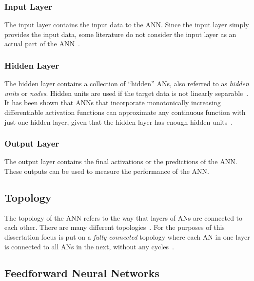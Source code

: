 \subsubsection{Input Layer}\label{sec:anns:anns:architecture:input}

The input layer contains the input data to the \acs{ANN}. Since the input layer simply provides the input data, some literature do not consider the input layer as an actual part of the \acs{ANN}~\cite{ref:engelbrecht:2007}.

\subsubsection{Hidden Layer}\label{sec:anns:anns:architecture:hidden}

The hidden layer contains a collection of ``hidden'' \acp{AN}, also referred to as \textit{hidden units} or \textit{nodes}. Hidden units are used if the target data is not linearly separable~\cite{ref:engelbrecht:2007}. It has been shown that \acp{ANN} that incorporate monotonically increasing differentiable activation functions can approximate any continuous function with just one hidden layer, given that the hidden layer has enough hidden units~\cite{ref:hornik:1989}.

\subsubsection{Output Layer}\label{sec:anns:anns:architecture:output}

The output layer contains the final activations or the predictions of the \acs{ANN}. These outputs can be used to measure the performance of the \acs{ANN}.


\subsection{Topology}
\label{sec:anns:anns:topology}

The topology of the \acs{ANN} refers to the way that layers of \acp{AN} are connected to each other. There are many different topologies~\cite{ref:miikkulainen:2010}. For the purposes of this dissertation focus is put on a \textit{fully connected} topology where each \acs{AN} in one layer is connected to all \acp{AN} in the next, without any cycles~\cite{ref:zell:1994}.


\subsection{Feedforward Neural Networks}\label{sec:anns:anns:ffnns}

